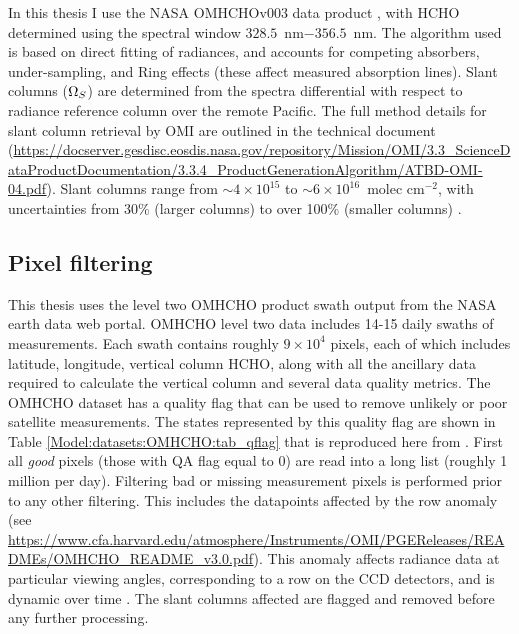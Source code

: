   In this thesis I use the NASA OMHCHOv003 data product \parencite{Abad2015}, with HCHO determined using the spectral window $328.5$~nm$ - 356.5$~nm. 
  The algorithm used is based on direct fitting of radiances, and accounts for competing absorbers, under-sampling, and Ring effects (these affect measured absorption lines).
  Slant columns ($\Omega_{S}$) are determined from the spectra differential with respect to radiance reference column over the remote Pacific.
  The full method details for slant column retrieval by OMI are outlined 
  in the technical document (\url{https://docserver.gesdisc.eosdis.nasa.gov/repository/Mission/OMI/3.3_ScienceDataProductDocumentation/3.3.4_ProductGenerationAlgorithm/ATBD-OMI-04.pdf}).
  Slant columns range from $\sim 4\times 10^{15} $ to $\sim 6 \times 10^{16}$~molec cm$^{-2}$, with uncertainties from 30\% (larger columns) to over 100\% (smaller columns) \parencite{Abad2015}.
  

  \subsection{Pixel filtering}
  \label{Model:omhcho:pixel_filtering}
  
    This thesis uses the level two OMHCHO product swath output from the NASA earth data web portal.
    OMHCHO level two data includes 14-15 daily swaths of measurements.
    Each swath contains roughly $9 \times 10^4$ pixels, each of which includes latitude, longitude, vertical column HCHO, along with all the ancillary data required to calculate the vertical column and several data quality metrics.
    The OMHCHO dataset has a quality flag that can be used to remove unlikely or poor satellite measurements.
    The states represented by this quality flag are shown in Table \ref{Model:datasets:OMHCHO:tab_qflag} that is reproduced here from \textcite{Kurosu2014}.
    First all \textit{good} pixels (those with QA flag equal to 0) are read into a long list (roughly 1 million per day).
    Filtering bad or missing measurement pixels is performed prior to any other filtering.
    This includes the datapoints affected by the row anomaly (see \url{https://www.cfa.harvard.edu/atmosphere/Instruments/OMI/PGEReleases/READMEs/OMHCHO_README_v3.0.pdf}).
    This anomaly affects radiance data at particular viewing angles, corresponding to a row on the CCD detectors, and is dynamic over time \parencite{Huang2018}.
    The slant columns affected are flagged and removed before any further processing.
    
